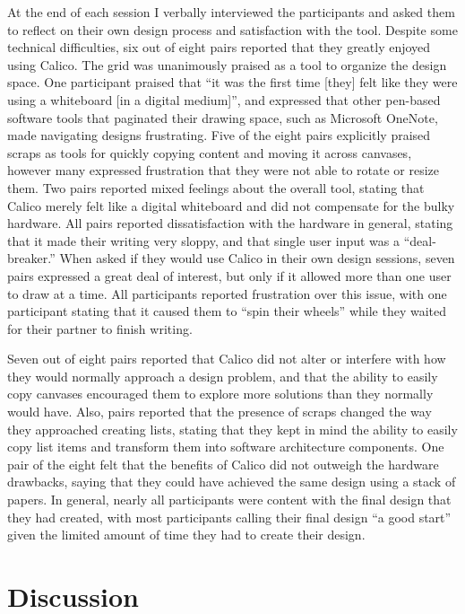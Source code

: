 \documentclass[12pt,fleqn]{ucithesis}
\begin{document}
At the end of each session I verbally interviewed the participants and asked them to reflect on their own design process and satisfaction with the tool. Despite some technical difficulties, six out of eight pairs reported that they greatly enjoyed using Calico. The grid was unanimously praised as a tool to organize the design space. One participant praised that ``it was the first time [they] felt like they were using a whiteboard [in a digital medium]'', and expressed that other pen-based software tools that paginated their drawing space, such as Microsoft OneNote, made navigating designs frustrating. Five of the eight pairs explicitly praised scraps as tools for quickly copying content and moving it across canvases, however many expressed frustration that they were not able to rotate or resize them. Two pairs reported mixed feelings about the overall tool, stating that Calico merely felt like a digital whiteboard and did not compensate for the bulky hardware. All pairs reported dissatisfaction with the hardware in general, stating that it made their writing very sloppy, and that single user input was a ``deal-breaker.'' When asked if they would use Calico in their own design sessions, seven pairs expressed a great deal of interest, but only if it allowed more than one user to draw at a time. All participants reported frustration over this issue, with one participant stating that it caused them to ``spin their wheels'' while they waited for their partner to finish writing. 

Seven out of eight pairs reported that Calico did not alter or interfere with how they would normally approach a design problem, and that the ability to easily copy canvases encouraged them to explore more solutions than they normally would have. Also, pairs reported that the presence of scraps changed the way they approached creating lists, stating that they kept in mind the ability to easily copy list items and transform them into software architecture components. One pair of the eight felt that the benefits of Calico did not outweigh the hardware drawbacks, saying that they could have achieved the same design using a stack of papers. In general, nearly all participants were content with the final design that they had created, with most participants calling their final design ``a good start'' given the limited amount of time they had to create their design. 

\section{Discussion}
\label{discussion}
\end{document}
